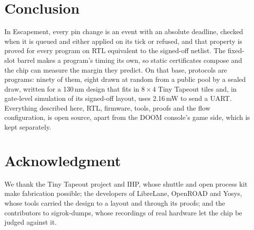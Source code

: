 \documentclass[conference,letterpaper]{IEEEtran}
\begin{document}
\section{Conclusion}

In Escapement, every pin change is an
event with an absolute deadline, checked when it is queued and either applied on its
tick or refused, and that property is proved for every program on RTL equivalent to the
signed-off netlist. The fixed-slot barrel makes a program's timing its own, so
static certificates compose and the chip can measure the margin they predict. On that
base, protocols are programs: ninety of them, eight drawn at random from a public pool
by a sealed draw, written for a 130\,nm design that fits in $8\times4$ Tiny Tapeout tiles
and, in gate-level simulation of its signed-off layout, uses 2.16\,mW to send a UART. Everything described here,
RTL, firmware, tools, proofs and the flow configuration, is open source, apart from the
DOOM console's game side, which is kept separately.

\section*{Acknowledgment}

We thank the Tiny Tapeout project and IHP, whose shuttle and open process kit make
fabrication possible; the developers of LibreLane, OpenROAD and Yosys, whose tools carried
the design to a layout and through its proofs; and the contributors to sigrok-dumps, whose
recordings of real hardware let the chip be judged against it.



\end{document}
